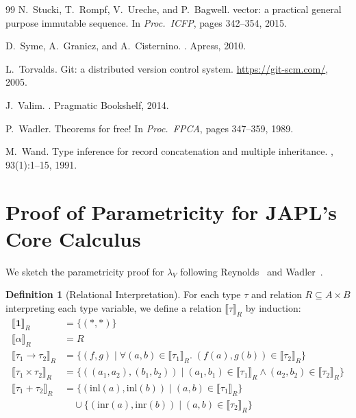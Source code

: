\documentclass[11pt]{article}
\theoremstyle{definition}
\newtheorem{definition}[theorem]{Definition}
\theoremstyle{remark}
\newcommand{\sem}[1]{\llbracket #1 \rrbracket}
\begin{document}
\begin{thebibliography}{99}
N.~Stucki, T.~Rompf, V.~Ureche, and P.~Bagwell.
 vector: a practical general purpose immutable sequence.
\newblock In {\em Proc.\ ICFP}, pages 342--354, 2015.

D.~Syme, A.~Granicz, and A.~Cisternino.
.
\newblock Apress, 2010.

L.~Torvalds.
\newblock Git: a distributed version control system.
\newblock \url{https://git-scm.com/}, 2005.

J.~Valim.
.
\newblock Pragmatic Bookshelf, 2014.

P.~Wadler.
\newblock Theorems for free!
\newblock In {\em Proc.\ FPCA}, pages 347--359, 1989.

M.~Wand.
\newblock Type inference for record concatenation and multiple inheritance.
, 93(1):1--15, 1991.

\end{thebibliography}

\appendix
\section{Proof of Parametricity for JAPL's Core Calculus}
\label{app:parametricity}

We sketch the parametricity proof for $\lambda_V$ following
Reynolds~\cite{reynolds1974towards} and Wadler~\cite{wadler1989theorems}.

\begin{definition}[Relational Interpretation]
For each type $\tau$ and relation $R \subseteq A \times B$ interpreting
each type variable, we define a relation $\sem{\tau}_R$ by induction:
\begin{align}
  \sem{\mathbf{1}}_R &= \{(\ast, \ast)\} \\
  \sem{\alpha}_R &= R \\
  \sem{\tau_1 \to \tau_2}_R &= \{(f, g) \mid \forall (a, b) \in
    \sem{\tau_1}_R.\; (f(a), g(b)) \in \sem{\tau_2}_R\} \\
  \sem{\tau_1 \times \tau_2}_R &= \{((a_1, a_2), (b_1, b_2)) \mid
    (a_1, b_1) \in \sem{\tau_1}_R \wedge (a_2, b_2) \in \sem{\tau_2}_R\} \\
  \sem{\tau_1 + \tau_2}_R &= \{(\mathrm{inl}(a), \mathrm{inl}(b)) \mid
    (a, b) \in \sem{\tau_1}_R\} \\
    &\quad \cup \{(\mathrm{inr}(a), \mathrm{inr}(b)) \mid
    (a, b) \in \sem{\tau_2}_R\}
\end{align}
\end{definition}
\end{document}
